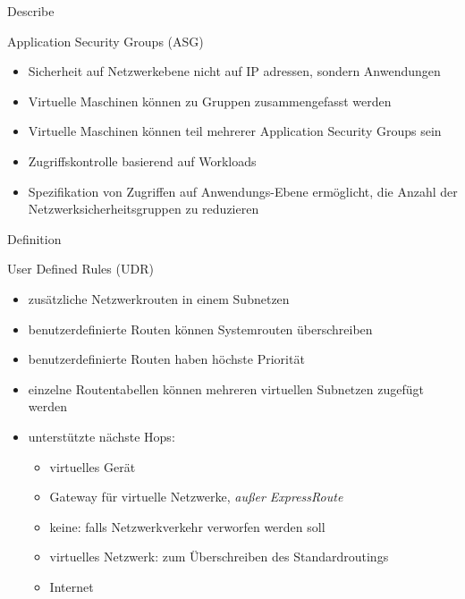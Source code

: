 \documentclass{scrartcl}
\newenvironment{flashcard}[2][]{%
    #1
    \vfill
    \centerline{\Large{#2}}
    \vfill
\newpage
}
{\newpage}
\begin{document}
    \begin{flashcard}[Describe]{Application Security Groups (ASG)}
        \begin{itemize}
            \item Sicherheit auf Netzwerkebene nicht auf IP adressen, sondern Anwendungen
            \item Virtuelle Maschinen können zu Gruppen zusammengefasst werden
            \item Virtuelle Maschinen können teil mehrerer Application Security Groups sein
            \item Zugriffskontrolle basierend auf Workloads
            \item Spezifikation von Zugriffen auf Anwendungs-Ebene ermöglicht, die Anzahl der Netzwerksicherheitsgruppen zu reduzieren
        \end{itemize}
    \end{flashcard}

    \begin{flashcard}[Definition]{User Defined Rules (UDR)}
        \begin{itemize}
            \item zusätzliche Netzwerkrouten in einem Subnetzen
            \item benutzerdefinierte Routen können Systemrouten überschreiben
            \item benutzerdefinierte Routen haben höchste Priorität
            \item einzelne Routentabellen können mehreren virtuellen Subnetzen zugefügt werden
            \item unterstützte nächste Hops:
            \begin{itemize}
                \item virtuelles Gerät
                \item Gateway für virtuelle Netzwerke, \emph{außer ExpressRoute}
                \item keine: falls Netzwerkverkehr verworfen werden soll
                \item virtuelles Netzwerk: zum Überschreiben des Standardroutings
                \item Internet
            \end{itemize}

        \end{itemize}

    \end{flashcard}
\end{document}
